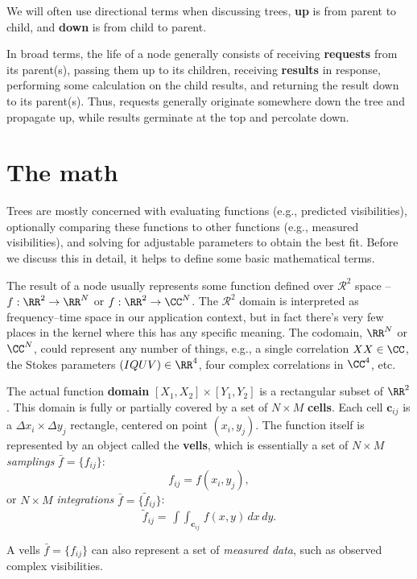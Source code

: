   We will often use directional terms when discussing trees, {\bf up} is from
  parent to child, and {\bf down} is from child to parent.

  In broad terms, the life of a node generally consists of receiving {\bf
  requests} from its parent(s), passing them up to its children, receiving {\bf
  results} in response, performing some calculation on the child results, and
  returning the result down to its parent(s). Thus, requests generally originate
  somewhere down the tree and propagate up, while results germinate at the top
  and percolate down. 

\section{The math}
  \label{sec:math}

  Trees are mostly concerned with evaluating functions (e.g., predicted
  visibilities), optionally comparing these functions to other functions (e.g.,
  measured visibilities), and solving for adjustable parameters to obtain the
  best fit. Before we discuss this in detail, it helps to define some basic 
  mathematical terms.

  The result of a node usually represents some function defined over
  $\mathcal{R}^2$ space -- $f:\RR^2\rightarrow\RR^N$ or
  $f:\RR^2\rightarrow\CC^N$. The $\mathcal{R}^2$ domain is interpreted as
  frequency--time space in our application context, but in fact there's very
  few places in the kernel where this has any specific meaning. The codomain,
  $\RR^N$ or $\CC^N$, could represent any number of things, e.g., a single
  correlation $XX\in\CC$, the Stokes parameters $(IQUV)\in\RR^4$, four complex
  correlations in $\CC^4$, etc.

  The actual function {\bf domain} $[X_1,X_2]\times[Y_1,Y_2]$  is a rectangular
  subset of $\RR^2$. This domain is fully or partially covered  by a set of
  $N\times M$ {\bf cells}. Each cell ${\mathbf c}_{ij}$ is a $\Delta
  x_i\times\Delta y_j$ rectangle, centered on point $(x_i,y_j)$. The function
  itself is represented by an object called the {\bf vells}, which is
  essentially a set of $N\times M$ {\em samplings}\/ $\bar{f}=\{f_{ij}\}$: 
  $$f_{ij}=f(x_i,y_j),$$ or $N\times M$ {\em integrations}\/
  $\bar{f}=\{\tilde{f}_{ij}\}$: $$
  \tilde{f}_{ij}=\mathop{\int\!\!\!\int}_{{\mathbf c}_{ij}}f(x,y)\,dx\,dy.$$

  A vells $\bar{f}=\{f_{ij}\}$ can also represent a set of {\em measured data}, such as
  observed complex visibilities. 
  
